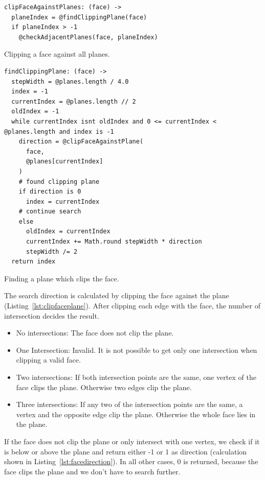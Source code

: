 \documentclass[../ClassicThesis.tex]{subfiles}
\begin{document}
\begin{listing}
\begin{verbatim}
clipFaceAgainstPlanes: (face) ->
  planeIndex = @findClippingPlane(face)
  if planeIndex > -1
    @checkAdjacentPlanes(face, planeIndex)
\end{verbatim}
\caption{Clipping a face against all planes.}
\label{lst:clipfaceplanes}
\end{listing}

\begin{listing}
\begin{verbatim}
findClippingPlane: (face) ->
  stepWidth = @planes.length / 4.0
  index = -1
  currentIndex = @planes.length // 2
  oldIndex = -1
  while currentIndex isnt oldIndex and 0 <= currentIndex < @planes.length and index is -1
    direction = @clipFaceAgainstPlane(
      face, 
      @planes[currentIndex]
    )
    # found clipping plane
    if direction is 0
      index = currentIndex
    # continue search
    else
      oldIndex = currentIndex
      currentIndex += Math.round stepWidth * direction
      stepWidth /= 2
  return index
\end{verbatim}
\caption{Finding a plane which clips the face.}
\label{lst:findplane}
\end{listing}

The search direction is calculated by clipping the face against the plane (Listing~\ref{lst:clipfaceplane}). After clipping each edge with the face, the number of intersection decides the result.

\begin{itemize}
  \item No intersections: The face does not clip the plane.
  \item One Intersection: Invalid. It is not possible to get only one intersection when clipping a valid face.
  \item Two intersections: If both intersection points are the same, one vertex of the face clips the plane. Otherwise two edges clip the plane.
  \item Three intersections: If any two of the intersection points are the same, a vertex and the opposite edge clip the plane. Otherwise the whole face lies in the plane.
\end{itemize}

If the face does not clip the plane or only intersect with one vertex, we check if it is below or above the plane and return either -1 or 1 as direction (calculation shown in Listing~\ref{lst:facedirection}). In all other cases, 0 is returned, because the face clips the plane and we don't have to search further. 
\end{document}
